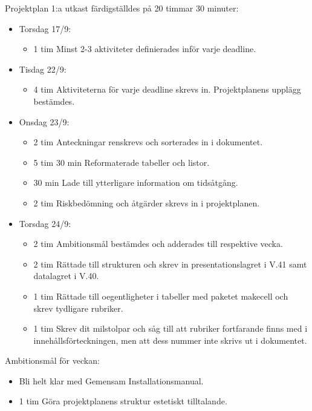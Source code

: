 \documentclass{TDP003mall}
\begin{document}
	Projektplan 1:a utkast färdigställdes på 20 timmar 30 minuter:
\begin{itemize}
	\item Torsdag 17/9:
	\begin{itemize}
		\item 1 tim Minst 2-3 aktiviteter definierades inför varje deadline.
	\end{itemize}
	\item Tisdag 22/9:
	\begin{itemize}
		\item 4 tim Aktiviteterna för varje deadline skrevs in. Projektplanens upplägg bestämdes.
	\end{itemize}
	\item Onsdag 23/9:
	\begin{itemize}
		\item 2 tim Anteckningar renskrevs och sorterades in i dokumentet.
		\item 5 tim 30 min Reformaterade tabeller och listor.
		\item 30 min Lade till ytterligare information om tidsåtgång.
                \item 2 tim Riskbedömning och åtgärder skrevs in i projektplanen.
	\end{itemize}
        \item Torsdag 24/9:
        \begin{itemize}
        \item 2 tim Ambitionsmål bestämdes och adderades till respektive vecka.
        \item 2 tim Rättade till strukturen och skrev in presentationslagret i V.41 samt datalagret i V.40.
        \item 1 tim Rättade till oegentligheter i tabeller med paketet makecell och skrev tydligare rubriker.
        \item 1 tim Skrev dit milstolpar och såg till att rubriker fortfarande finns med i innehållsförteckningen, men att dess nummer inte skrivs ut i dokumentet.
	\end{itemize}
      \end{itemize}

Ambitionsmål för veckan:
\begin{itemize}
\item Bli helt klar med Gemensam Installationsmanual.
  \item 1 tim Göra projektplanens struktur estetiskt tilltalande.
  \end{itemize}

\newpage
\end{document}
